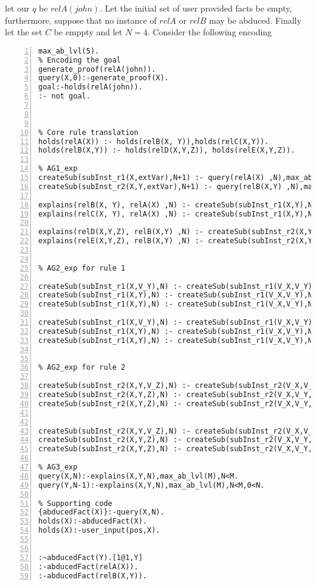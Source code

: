\documentclass[sigconf]{acmart}
\begin{document}
let our $q$ be $relA(john)$. Let the initial set of user provided facts be empty, furthermore, suppose that no instance of $relA$ or $relB$ may be abduced. Finally let the set $C$ be emppty and let $N=4$.  
Consider the following encoding
\begin{lstlisting}[numbers=left]
max_ab_lvl(5).
% Encoding the goal
generate_proof(relA(john)).
query(X,0):-generate_proof(X).
goal:-holds(relA(john)).
:- not goal.



% Core rule translation
holds(relA(X)) :- holds(relB(X, Y)),holds(relC(X,Y)).
holds(relB(X,Y)) :- holds(relD(X,Y,Z)), holds(relE(X,Y,Z)).

% AG1_exp
createSub(subInst_r1(X,extVar),N+1) :- query(relA(X) ,N),max_ab_lvl(M),N<M-1.
createSub(subInst_r2(X,Y,extVar),N+1) :- query(relB(X,Y) ,N),max_ab_lvl(M),N<M-1.

explains(relB(X, Y), relA(X) ,N) :- createSub(subInst_r1(X,Y),N).
explains(relC(X, Y), relA(X) ,N) :- createSub(subInst_r1(X,Y),N).

explains(relD(X,Y,Z), relB(X,Y) ,N) :- createSub(subInst_r2(X,Y,Z),N).
explains(relE(X,Y,Z), relB(X,Y) ,N) :- createSub(subInst_r2(X,Y,Z),N).


% AG2_exp for rule 1

createSub(subInst_r1(X,V_Y),N) :- createSub(subInst_r1(V_X,V_Y),N), holds(relA(X)).
createSub(subInst_r1(X,Y),N) :- createSub(subInst_r1(V_X,V_Y),N), holds(relB(X,Y)).
createSub(subInst_r1(X,Y),N) :- createSub(subInst_r1(V_X,V_Y),N), holds(relC(X,Y)).

createSub(subInst_r1(X,V_Y),N) :- createSub(subInst_r1(V_X,V_Y),N), query(relA(X),N-1),0<N.
createSub(subInst_r1(X,Y),N) :- createSub(subInst_r1(V_X,V_Y),N), query(relB(X,Y),N).
createSub(subInst_r1(X,Y),N) :- createSub(subInst_r1(V_X,V_Y),N), query(relC(X,Y),N).


% AG2_exp for rule 2

createSub(subInst_r2(X,Y,V_Z),N) :- createSub(subInst_r2(V_X,V_Y,V_Z),N), holds(relB(X,Y)).
createSub(subInst_r2(X,Y,Z),N) :- createSub(subInst_r2(V_X,V_Y,V_Z),N), holds(relD(X,Y,Z)).
createSub(subInst_r2(X,Y,Z),N) :- createSub(subInst_r2(V_X,V_Y,V_Z),N), holds(relE(X,Y,Z)).


createSub(subInst_r2(X,Y,V_Z),N) :- createSub(subInst_r2(V_X,V_Y,V_Z),N), query(relB(X,Y),N-1),0<N.
createSub(subInst_r2(X,Y,Z),N) :- createSub(subInst_r2(V_X,V_Y,V_Z),N), query(relD(X,Y,Z),N).
createSub(subInst_r2(X,Y,Z),N) :- createSub(subInst_r2(V_X,V_Y,V_Z),N), query(relE(X,Y,Z),N).

% AG3_exp
query(X,N):-explains(X,Y,N),max_ab_lvl(M),N<M.
query(Y,N-1):-explains(X,Y,N),max_ab_lvl(M),N<M,0<N.

% Supporting code
{abducedFact(X)}:-query(X,N).
holds(X):-abducedFact(X).
holds(X):-user_input(pos,X).


:~abducedFact(Y).[1@1,Y]
:-abducedFact(relA(X)).
:-abducedFact(relB(X,Y)).

\end{lstlisting}
\end{document}
